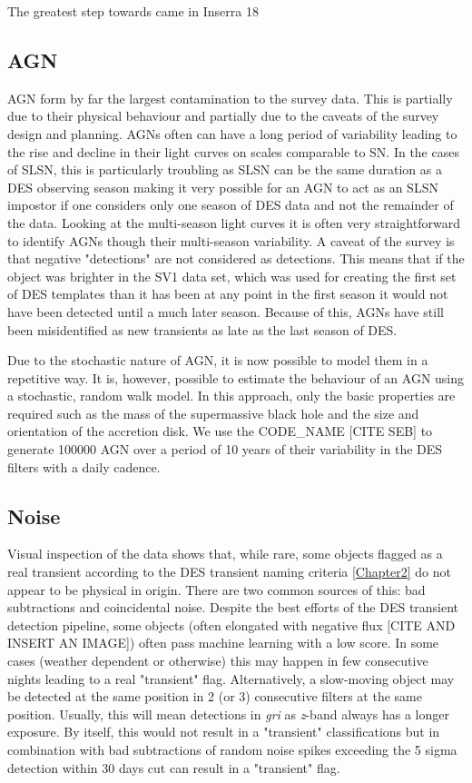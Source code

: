 The greatest step towards came in Inserra 18   

\subsection{AGN}
AGN form by far the largest contamination to the survey data. This is partially due to their physical behaviour and partially due to the caveats of the survey design and planning. AGNs often can have a long period of variability leading to the rise and decline in their light curves on scales comparable to SN. In the cases of SLSN, this is particularly troubling as SLSN can be the same duration as a DES observing season making it very possible for an AGN to act as an SLSN impostor if one considers only one season of DES data and not the remainder of the data. Looking at the multi-season light curves it is often very straightforward to identify AGNs though their multi-season variability. A caveat of the survey is that negative "detections" are not considered as detections. This means that if the object was brighter in the SV1 data set, which was used for creating the first set of DES templates than it has been at any point in the first season it would not have been detected until a much later season. Because of this, AGNs have still been misidentified as new transients as late as the last season of DES.

Due to the stochastic nature of AGN, it is now possible to model them in a repetitive way. It is, however, possible to estimate the behaviour of an AGN using a stochastic, random walk model. In this approach, only the basic properties are required such as the mass of the supermassive black hole and the size and orientation of the accretion disk. We use the CODE\_NAME [CITE SEB] to generate 100000 AGN over a period of 10 years of their variability in the DES filters with a daily cadence.

\subsection{Noise}
Visual inspection of the data shows that, while rare, some objects flagged as a real transient according to the DES transient naming criteria \cref{Chapter2} do not appear to be physical in origin. There are two common sources of this: bad subtractions and coincidental noise. Despite the best efforts of the DES transient detection pipeline, some objects (often elongated with negative flux [CITE AND INSERT AN IMAGE]) often pass machine learning with a low score. In some cases (weather dependent or otherwise) this may happen in few consecutive nights leading to a real "transient" flag. Alternatively, a slow-moving object may be detected at the same position in 2 (or 3) consecutive filters at the same position. Usually, this will mean detections in \textit{gri} as \textit{z}-band always has a longer exposure. By itself, this would not result in a "transient" classifications but in combination with bad subtractions of random noise spikes exceeding the 5 sigma detection within 30 days cut can result in a "transient" flag.

